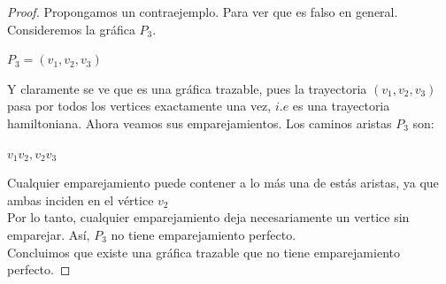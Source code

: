 \documentclass{article}
\begin{document}
	\begin{proof}
	Propongamos un contraejemplo. Para ver que es falso en general. \\
	Consideremos la gráfica $P_3$. 
	\begin{center}
		$P_3 = (v_1,v_2,v_3)$
	\end{center}
	Y claramente se ve que es una gráfica trazable, pues la trayectoria $(v_1,v_2,v_3)$ pasa por todos los vertices exactamente una vez, $i.e$ es una
	trayectoria hamiltoniana. 
	\newline Ahora veamos sus emparejamientos. Los caminos aristas $P_3$ son: \\
	\begin{center}
		$v_1v_2 , v_2v_3$
	 \end{center}
	Cualquier emparejamiento puede contener a lo más una de estás aristas, ya que ambas inciden en el vértice $v_2$ \\
	Por lo tanto, cualquier emparejamiento deja necesariamente un vertice sin emparejar.
	\newline Así, $P_3$ no tiene emparejamiento perfecto. \\
	Concluimos que existe una gráfica trazable que no tiene emparejamiento perfecto.



	\end{proof}
\newpage
\end{document}
